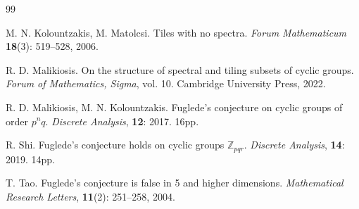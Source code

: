 \documentclass[10pt]{article}
\newcommand{\Z}{\mathbb{Z}}
\begin{document}
\begin{thebibliography}{99}
        
M. N. Kolountzakis, M. Matolcsi. 
\newblock
Tiles with no spectra. 
\newblock
{\em Forum Mathematicum} \textbf{18}(3): 519--528, 2006.
        
R. D. Malikiosis. 
On the structure of spectral and tiling subsets of cyclic groups. 
\newblock
{\em Forum of Mathematics, Sigma}, vol. 10. Cambridge University Press, 2022. 	

R. D. Malikiosis, M. N. Kolountzakis. 
\newblock
Fuglede's conjecture on cyclic groups of order $p^nq$. 
\newblock
{\em Discrete Analysis}, {\bf 12}: 2017. 16pp.

R. Shi.
\newblock
Fuglede's conjecture holds on cyclic groups $\Z_{pqr}$. 
\newblock 
{\em Discrete Analysis}, \textbf{14}: 2019. 14pp.
        
T. Tao. 
\newblock 
 Fuglede's conjecture is false in 5 and higher dimensions. 
 \newblock
 {\em Mathematical Research Letters}, {\bf 11}(2): 251--258, 2004.
        
 \end{thebibliography}
\end{document}

